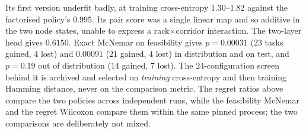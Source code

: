 Its first version underfit badly, at training cross-entropy $1.30$--$1.82$ against
the factorised policy's $0.995$.  Its pair score was a single linear map and so
additive in the two node states, unable to express a rack$\times$corridor
interaction.  The two-layer head gives $0.6150$.  Exact McNemar
on feasibility gives $p=0.00031$ ($23$ tasks gained, $4$ lost) and $0.00091$ ($21$
gained, $4$ lost) in distribution and on test, and $p=0.19$ out of distribution ($14$
gained, $7$ lost).  The $24$-configuration screen behind it is archived and
selected on \emph{training} cross-entropy and then training Hamming distance, never on the comparison metric. The regret ratios above compare the two policies across independent runs, while
the feasibility McNemar and the regret Wilcoxon compare them within the same pinned
process; the two comparisons are deliberately not mixed.

